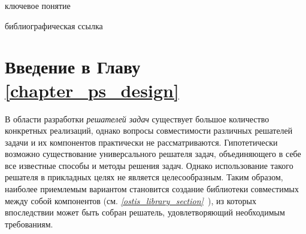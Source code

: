 \begin{SCn}
\begin{scnrelfromlist}{ключевое понятие}
\end{scnrelfromlist}

\bigskip

\begin{scnrelfromlist}{библиографическая ссылка}
\end{scnrelfromlist}
\end{SCn}

\section*{Введение в Главу \ref{chapter_ps_design}}

В области разработки \textit{решателей задач} существует большое количество конкретных реализаций, однако вопросы совместимости различных решателей задачи и их компонентов практически не рассматриваются. Гипотетически возможно существование универсального решателя задач, объединяющего в себе все известные способы и методы решения задач. Однако использование такого решателя в прикладных целях не является целесообразным. Таким образом, наиболее приемлемым вариантом становится создание библиотеки совместимых между собой компонентов (см. \textit{\ref{ostis_library_section}~}), из которых впоследствии может быть собран решатель, удовлетворяющий необходимым требованиям.

